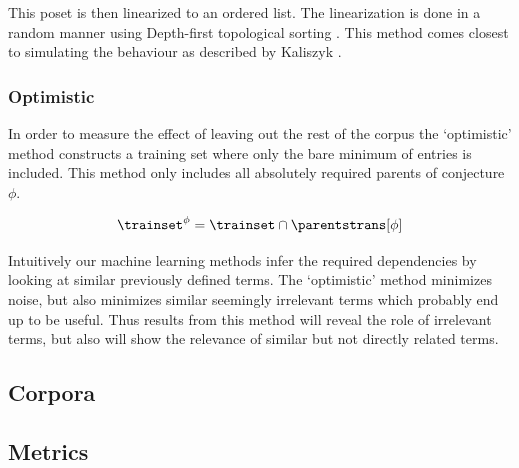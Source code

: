 This poset is then linearized to an ordered list.
The linearization is done in a random manner using Depth-first topological sorting \cite{tarjan1976edge}.
This method comes closest to simulating the behaviour as described by Kaliszyk \cite{kaliszyk2014machine}.

\subsubsection{Optimistic}

In order to measure the effect of leaving out the rest of the corpus
the `optimistic' method constructs a training set where only the bare minimum of entries is included.
This method only includes all absolutely required parents of conjecture $\phi$.

\begin{definition}
  \[
    \trainset^{\phi} = \trainset \cap \parentstrans[\phi]
  \]
\end{definition}

Intuitively our machine learning methods infer the required dependencies by looking at similar previously defined terms.
The `optimistic' method minimizes noise, but also minimizes similar seemingly irrelevant terms which probably end up to be useful.
Thus results from this method will reveal the role of irrelevant terms, but also will show the relevance of similar but not directly related terms.

\subsection{Corpora}
\label{section:corpora}


\subsection{Metrics}
\label{section:metrics}

